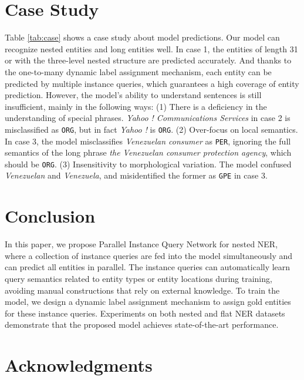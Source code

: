 \documentclass[11pt]{article}
\begin{document}
\section{Case Study}


\label{cs}

Table \ref{tab:case} shows a case study about model predictions. Our model can recognize nested entities and long entities well. In case 1, the entities of length 31 or with the three-level nested structure are predicted accurately. And thanks to the one-to-many dynamic label assignment mechanism, each entity can be predicted by multiple instance queries, which guarantees a high coverage of entity prediction. However, the model's ability to understand sentences is still insufficient, mainly in the following ways: (1) There is a deficiency in the understanding of special phrases. \textit{Yahoo ! Communications Services} in case 2 is misclassified as \texttt{ORG}, but in fact \textit{Yahoo !} is \texttt{ORG}. (2) Over-focus on local semantics. In case 3, the model misclassifies \textit{Venezuelan consumer} as \texttt{PER}, ignoring the full semantics of the long phrase \textit{the Venezuelan consumer protection agency}, which should be \texttt{ORG}. (3) Insensitivity to morphological variation. The model confused \textit{Venezuelan} and \textit{Venezuela}, and misidentified the former as \texttt{GPE} in case 3.







\section{Conclusion}

In this paper, we propose Parallel Instance Query Network for nested NER, where a collection of instance queries are fed into the model simultaneously and can predict all entities in parallel. The instance queries can automatically learn query semantics related to entity types or entity locations during training, avoiding manual constructions that rely on external knowledge. To train the model, we design a dynamic label assignment mechanism to assign gold entities for these instance queries.
Experiments on both nested and flat NER datasets demonstrate that the proposed model achieves state-of-the-art performance.


\section*{Acknowledgments}
\end{document}
